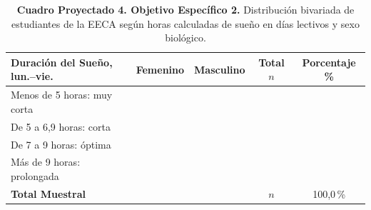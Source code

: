 \documentclass[12pt, letterpaper]{article}
\begin{document}
\begin{table}[H]
\centering
\begin{singlespace}
\caption*{\textbf{Cuadro Proyectado 4. Objetivo Específico 2.} Distribución bivariada de estudiantes de la EECA según horas calculadas de sueño en días lectivos y sexo biológico.}
\small
\begin{tabular}{lcccc}
\toprule
\textbf{Duración del Sueño, lun.--vie.} & \textbf{Femenino} & \textbf{Masculino} & \textbf{Total $n$} & \textbf{Porcentaje \%} \\
\midrule
Menos de 5 horas: muy corta & & & & \\
De 5 a 6,9 horas: corta & & & & \\
De 7 a 9 horas: óptima & & & & \\
Más de 9 horas: prolongada & & & & \\
\midrule
\textbf{Total Muestral} & & & $n$ & 100,0\,\% \\
\bottomrule
\end{tabular}
\end{singlespace}
\end{table}

\begin{table}[H]
\centering
\begin{singlespace}
\caption*{\textbf{Cuadro Proyectado 5. Objetivo Específico 3.} Distribución de despertares nocturnos involuntarios según ciclo académico y semestre cursado.}
\end{singlespace}
\end{table}


\end{document}
